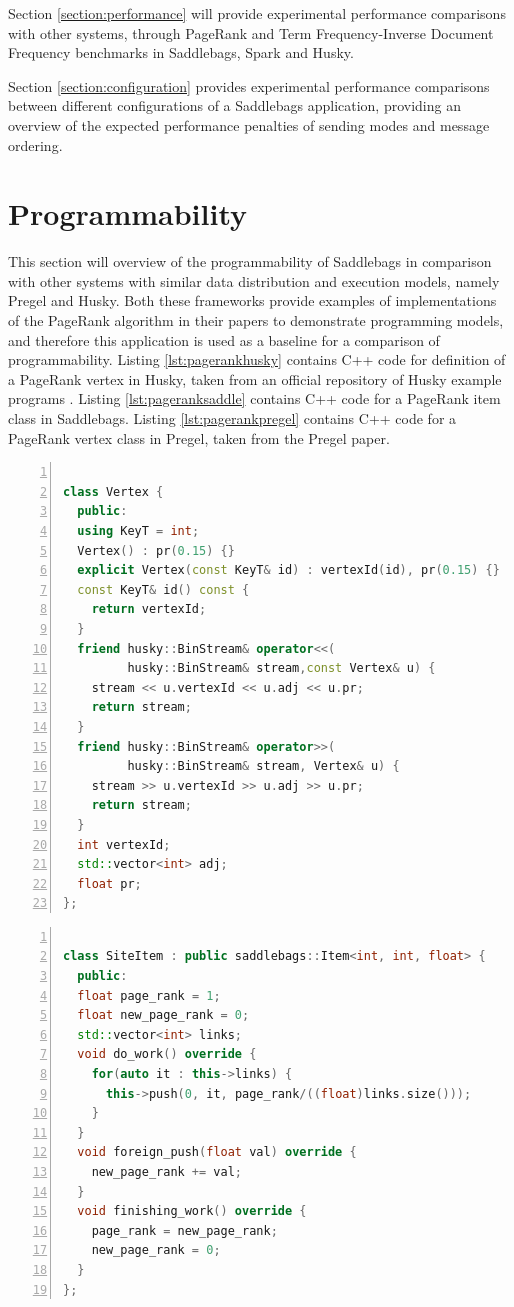 \documentclass{uit-report}
\begin{document}
Section \ref{section:performance} will provide experimental performance comparisons with other systems, through PageRank and Term Frequency-Inverse Document Frequency benchmarks in Saddlebags, Spark and Husky.

Section \ref{section:configuration} provides experimental performance comparisons between different configurations of a Saddlebags application, providing an overview of the expected performance penalties of sending modes and message ordering.

\newpage
\section{Programmability}\label{section:programmability}
This section will overview of the programmability of Saddlebags in comparison with other systems with similar data distribution and execution models, namely Pregel and Husky. Both these frameworks provide examples of implementations of the PageRank algorithm in their papers \cite{husky} \cite{pregel} to demonstrate programming models, and therefore this application is used as a baseline for a comparison of programmability. Listing \ref{lst:pagerankhusky} contains C++ code for definition of a PageRank vertex in Husky, taken from an official repository of Husky example programs \cite{huskyexample}. Listing \ref{lst:pageranksaddle} contains C++ code for a PageRank item class in Saddlebags. Listing \ref{lst:pagerankpregel} contains C++ code for a PageRank vertex class in Pregel, taken from the Pregel paper.

\begin{lstlisting}[label={lst:pagerankhusky}, float=h!,frame=tlrb,numbers=left, caption={PageRank vertex class in Husky}, captionpos=t, language=c++, showstringspaces=false]

class Vertex {
  public:
  using KeyT = int;
  Vertex() : pr(0.15) {}
  explicit Vertex(const KeyT& id) : vertexId(id), pr(0.15) {}
  const KeyT& id() const {
    return vertexId;
  }
  friend husky::BinStream& operator<<(
         husky::BinStream& stream,const Vertex& u) {
    stream << u.vertexId << u.adj << u.pr;
    return stream;
  }
  friend husky::BinStream& operator>>(
         husky::BinStream& stream, Vertex& u) {
    stream >> u.vertexId >> u.adj >> u.pr;
    return stream;
  }
  int vertexId;
  std::vector<int> adj;
  float pr;
};
\end{lstlisting}

\begin{lstlisting}[label={lst:pageranksaddle}, float=h!,frame=tlrb,numbers=left, caption={PageRank item class in Saddlebags}, captionpos=t, language=c++, showstringspaces=false]

class SiteItem : public saddlebags::Item<int, int, float> {
  public:
  float page_rank = 1;
  float new_page_rank = 0;
  std::vector<int> links;
  void do_work() override {
    for(auto it : this->links) {
      this->push(0, it, page_rank/((float)links.size()));
    }
  }
  void foreign_push(float val) override {
    new_page_rank += val;
  }
  void finishing_work() override {
    page_rank = new_page_rank;
    new_page_rank = 0;
  }
};
\end{lstlisting}
\end{document}
